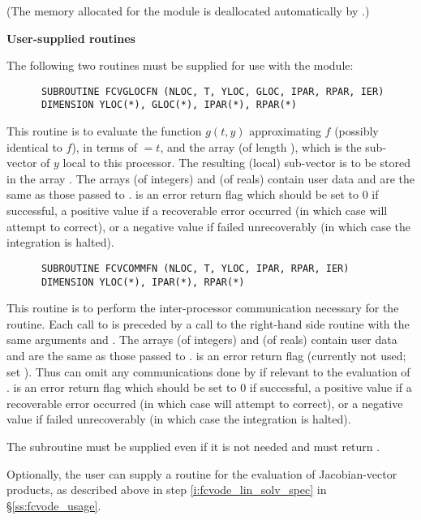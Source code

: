 \begin{Steps}
  (The memory allocated for the {\fcvbbd} module is deallocated automatically
  by .)


\item {\bf User-supplied routines}

  The following two routines must be supplied for use with the {\cvbbdpre}
  module:
\begin{verbatim}
      SUBROUTINE FCVGLOCFN (NLOC, T, YLOC, GLOC, IPAR, RPAR, IER)
      DIMENSION YLOC(*), GLOC(*), IPAR(*), RPAR(*)
\end{verbatim}
  This routine is to evaluate the function $g(t,y)$ approximating $f$
  (possibly identical to $f$), in terms of  $ = t$, and the array
   (of length ), which is the sub-vector
  of $y$ local to this processor.  The resulting (local) sub-vector
  is to be stored in the array .
  The arrays  (of integers) and  (of reals) contain user data
  and are the same as those passed to .
   is an error return flag which should be set to $0$ if successful, 
  a positive value if a recoverable error occurred (in which case {\cvode} will 
  attempt to correct), or a negative value if  failed unrecoverably 
  (in which case the integration is halted).

\begin{verbatim}
      SUBROUTINE FCVCOMMFN (NLOC, T, YLOC, IPAR, RPAR, IER)
      DIMENSION YLOC(*), IPAR(*), RPAR(*)
\end{verbatim}
  This routine is to perform the inter-processor communication necessary
  for the  routine.
  Each call to  is preceded by a call to the right-hand side
  routine  with the same arguments  and .
  The arrays  (of integers) and  (of reals) contain user data
  and are the same as those passed to .
   is an error return flag (currently not used; set ). 
  Thus  can omit any communications done by  if
  relevant to the evaluation of .
   is an error return flag which should be set to $0$ if successful, 
  a positive value if a recoverable error occurred (in which case {\cvode} will 
  attempt to correct), or a negative value if  failed unrecoverably 
  (in which case the integration is halted).


  {\warn}The subroutine  must be supplied even if it is not needed 
  and must return .

  Optionally, the user can supply a routine  for the evaluation of
  Jacobian-vector products, as described above in step \ref{i:fcvode_lin_solv_spec}
  in \S\ref{ss:fcvode_usage}.

\end{Steps}

